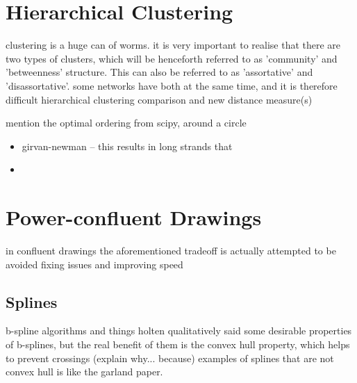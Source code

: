 \section{Hierarchical Clustering}
clustering is a huge can of worms.
it is very important to realise that there are two types of clusters, which will be henceforth referred to as 'community' and 'betweenness' structure. This can also be referred to as 'assortative' and 'disassortative'.
some networks have both at the same time, and it is therefore difficult 
hierarchical clustering comparison and new distance measure(s)

mention the optimal ordering from scipy, around a circle

\begin{itemize}
    \item girvan-newman -- this results in long strands that \item
\end{itemize}

\section{Power-confluent Drawings}
in confluent drawings the aforementioned tradeoff is actually attempted to be avoided
fixing issues and improving speed
\subsection{Splines}
b-spline algorithms and things
holten qualitatively said some desirable properties of b-splines, but the real benefit of them is the convex hull property, which helps to prevent crossings (explain why... because)
examples of splines that are not convex hull is like the garland paper.
